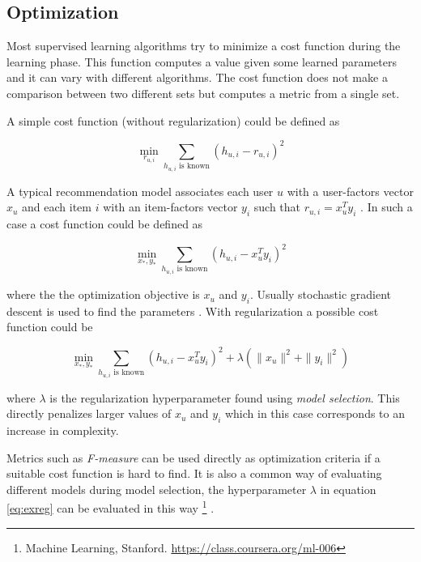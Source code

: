 
\subsection{Optimization}\label{sec:background:theory:opt}

Most supervised learning algorithms try to minimize a cost function during the learning phase. This function computes a value given some learned parameters and it can vary with different algorithms. The cost function does not make a comparison between two different sets but computes a metric from a single set.

A simple cost function (without regularization) could be defined as

\begin{equation}
    \min_{r_{u, i}} \sum_{h_{u,i} \text{ is known} } (h_{u, i} - r_{u, i})^2
\end{equation}

A typical recommendation model associates each user $u$ with a user-factors vector $x_u$ and each item $i$ with an item-factors vector $y_i$ such that $r_{u, i} = x_u^T y_i$
\citep{hu2008collaborative}. In such a case a cost function could be defined as

\begin{equation}
    \min_{x_*, y_*} \sum_{h_{u,i} \text{ is known} } (h_{u, i} - x_{u}^T y_i)^2
\end{equation}

where the the optimization objective is $x_u$ and $y_i$. Usually stochastic gradient descent is used to find the parameters \cite{hu2008collaborative}. With regularization a possible cost function could be

\begin{equation}\label{eq:exreg}
    \min_{x_*, y_*} \sum_{h_{u,i} \text{ is known} } (h_{u, i} - x_{u}^T y_i)^2 + \lambda(\|x_u\|^2 + \|y_i\|^2)
\end{equation}

where $\lambda$ is the regularization hyperparameter found using \textit{model selection}. This directly penalizes larger values of $x_u$ and $y_i$ which in this case corresponds to an increase in complexity.

Metrics such as \textit{F-measure} can be used directly as optimization criteria if a suitable cost function is hard to find. It is also a common way of evaluating different models during model selection, the hyperparameter $\lambda$ in equation \eqref{eq:exreg} can be evaluated in this way
\footnote{Machine Learning, Stanford. \url{https://class.coursera.org/ml-006}}
.


